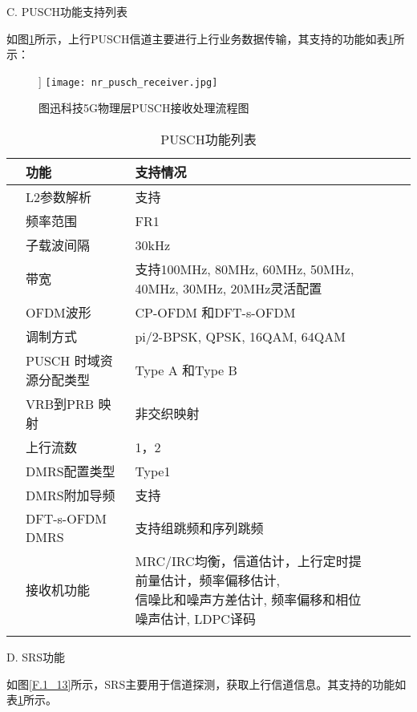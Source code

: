 C.	PUSCH功能支持列表

\par
{} %
\setlength{\hangindent}{2em}
如图\ref{F.1_12}所示，上行PUSCH信道主要进行上行业务数据传输，其支持的功能如表\ref{T.1_8}所示：

\begin{figure}[H]]
  \centering
  \texttt{[image: nr\_pusch\_receiver.jpg]}
  \caption{图迅科技5G物理层PUSCH接收处理流程图}
  \label{F.1_12}
\end{figure}


\begin{table}[H]
    \centering
    \caption{PUSCH功能列表}
    \label{T.1_8}
    \begin{tabular}{llllll}
        \hline
          & 功能   & 支持情况 \\
        \hline
          & L2参数解析 & 支持 \\
        \hline
          & 频率范围 & FR1 \\
        \hline
          & 子载波间隔 & 30kHz\\
        \hline
          & 带宽 & 支持100MHz, 80MHz, 60MHz, 50MHz, 40MHz, 30MHz, 20MHz灵活配置 \\
        \hline
          & OFDM波形 & CP-OFDM 和DFT-s-OFDM \\
        \hline
          & 调制方式 & pi/2-BPSK, QPSK, 16QAM, 64QAM \\
        \hline
          & PUSCH 时域资源分配类型 & Type A 和Type B \\
        \hline
          & VRB到PRB 映射 & 非交织映射 \\
        \hline
          & 上行流数 & 1，2 \\ 
        \hline
          & DMRS配置类型 & Type1 \\
        \hline
          & DMRS附加导频 & 支持 \\
        \hline
          & DFT-s-OFDM DMRS & 支持组跳频和序列跳频 \\
        \hline
          & 接收机功能 & \makecell[l]{MRC/IRC均衡，信道估计，上行定时提前量估计，频率偏移估计,\\信噪比和噪声方差估计, 频率偏移和相位噪声估计, LDPC译码} \\
        \hline{}
    \end{tabular}
\end{table}

D.	SRS功能

\par
{} %
\setlength{\hangindent}{2em}
如图\ref{F.1_13}所示，SRS主要用于信道探测，获取上行信道信息。其支持的功能如表\ref{T.1_8}所示。

